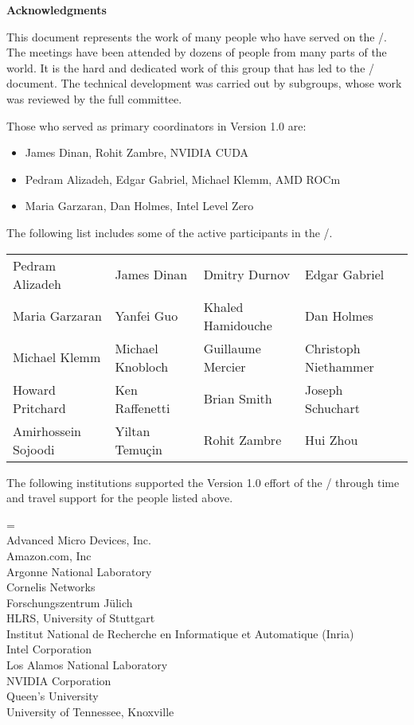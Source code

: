{\Huge\noindent\textbf{Acknowledgments}}%
{}

\vspace{0.5in}



This document represents the work of many people who have served on
the \MPIHACC/.  The meetings have been attended by dozens of people
from many parts of the world. It is the hard and dedicated work of
this group that has led to the \MEMALLOCDOC/ document. The technical
development was carried out by subgroups, whose work was reviewed by
the full committee.

Those who served as primary coordinators in Version 1.0 are:

\begin{itemize}
\item James Dinan, Rohit Zambre, NVIDIA CUDA
\item Pedram Alizadeh, Edgar Gabriel, Michael Klemm, AMD ROCm
\item Maria Garzaran, Dan Holmes, Intel Level Zero
\end{itemize}

The following list includes some of the active participants in
the \MPIHACC/.

\begin{center}
\begin{tabular}{llll}
Pedram Alizadeh &
James Dinan &
Dmitry Durnov &
Edgar Gabriel \\
Maria Garzaran &
Yanfei Guo &
Khaled Hamidouche &
Dan Holmes \\
Michael Klemm &
Michael Knobloch &
Guillaume Mercier &
Christoph Niethammer \\
Howard Pritchard &
Ken Raffenetti &
Brian Smith &
Joseph Schuchart \\
Amirhossein Sojoodi &
Yiltan Temuçin &
Rohit Zambre &
Hui Zhou
\end{tabular}
\end{center}

The following institutions supported the Version 1.0 effort
of the \MEMALLOCDOC/ through time and travel support for the people
listed above.

\medskip

\begin{obeylines}\leftskip=\parindent\parindent=0pt %
Advanced Micro Devices, Inc.
Amazon.com, Inc
Argonne National Laboratory
Cornelis Networks
Forschungszentrum Jülich
HLRS, University of Stuttgart
Institut National de Recherche en Informatique et Automatique (Inria)
Intel Corporation
Los Alamos National Laboratory
NVIDIA Corporation
Queen's University
University of Tennessee, Knoxville
\end{obeylines}
